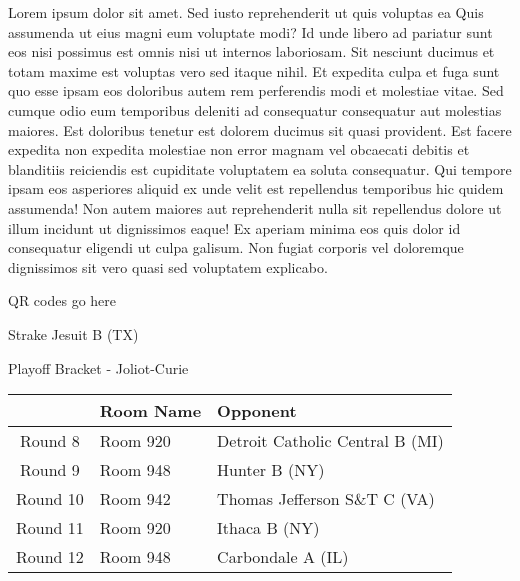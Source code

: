 \documentclass{article}%
\begin{document}
\vspace*{8pt}%
\linebreak%
\newline%
\newline%
Lorem ipsum dolor sit amet. Sed iusto reprehenderit ut quis voluptas ea Quis assumenda ut eius magni eum voluptate modi? Id unde libero ad pariatur sunt eos nisi possimus est omnis nisi ut internos laboriosam. Sit nesciunt ducimus et totam maxime est voluptas vero sed itaque nihil. Et expedita culpa et fuga sunt quo esse ipsam eos doloribus autem rem perferendis modi et molestiae vitae.\newline%
\newline%
Sed cumque odio eum temporibus deleniti ad consequatur consequatur aut molestias maiores. Est doloribus tenetur est dolorem ducimus sit quasi provident. Est facere expedita non expedita molestiae non error magnam vel obcaecati debitis et blanditiis reiciendis est cupiditate voluptatem ea soluta consequatur. Qui tempore ipsam eos asperiores aliquid ex unde velit est repellendus temporibus hic quidem assumenda!\newline%
\newline%
Non autem maiores aut reprehenderit nulla sit repellendus dolore ut illum incidunt ut dignissimos eaque! Ex aperiam minima eos quis dolor id consequatur eligendi ut culpa galisum. Non fugiat corporis vel doloremque dignissimos sit vero quasi sed voluptatem explicabo.\newline%
\newline%
%
\vspace*{30pt}%
\begin{center}%
\begin{Huge}%
QR codes go here%
\end{Huge}%
\end{center}%
\newpage%
\begin{center}%
\begin{Huge}%
Strake Jesuit B (TX)%
\end{Huge}%
\vspace*{8pt}%
\linebreak%
\begin{Large}%
Playoff Bracket {-} Joliot{-}Curie%
\end{Large}%
\end{center}%
%
\begin{tabularx}{\textwidth}{|c|Y|Y|}%
\hline%
&Room Name&Opponent\\%
\hline%
Round 8&Room 920&Detroit Catholic Central B (MI)\\%
Round 9&Room 948&Hunter B (NY)\\%
Round 10&Room 942&Thomas Jefferson S\&T C (VA)\\%
Round 11&Room 920&Ithaca B (NY)\\%
Round 12&Room 948&Carbondale A (IL)\\%
\hline%
\end{tabularx}%
\end{document}
